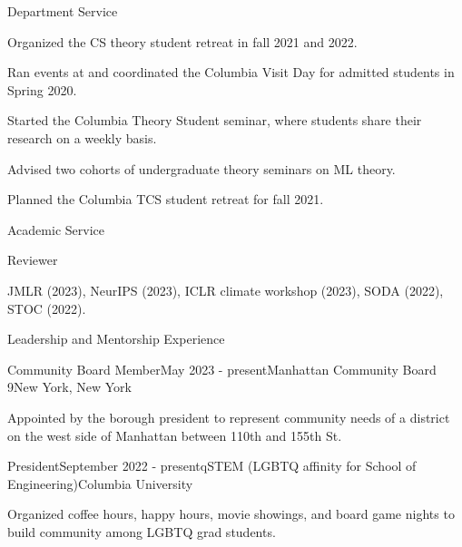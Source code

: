 \documentclass{resume} %
\begin{document}
\begin{rSection}{Department Service}
\begin{rSubsection}{}{}{}

    \item Organized the CS theory student retreat in fall 2021 and 2022.
    \item Ran events at and coordinated the Columbia Visit Day for admitted students in Spring 2020.
    \item Started the Columbia Theory Student seminar, where students share their research on a weekly basis.
    \item Advised two cohorts of undergraduate theory seminars on ML theory.
    \item Planned the Columbia TCS student retreat for fall 2021.
\end{rSubsection}

\begin{rSection}{Academic Service}
\begin{rSubsection}{Reviewer}{}{}

    \item JMLR (2023), NeurIPS (2023), ICLR climate workshop (2023), SODA (2022), STOC (2022).
\end{rSubsection}

\end{rSection}

\begin{rSection}{Leadership and Mentorship Experience}

\begin{rSubsection}{Community Board Member}{May 2023 - present}{Manhattan Community Board 9}{New York, New York}
\item Appointed by the borough president to represent community needs of a district on the west side of Manhattan between 110th and 155th St. 
\end{rSubsection}

\begin{rSubsection}{President}{September 2022 - present}{qSTEM (LGBTQ affinity for School of Engineering)}{Columbia University}
\item Organized coffee hours, happy hours, movie showings, and board game nights to build community among LGBTQ grad students.
\end{rSubsection}


\end{rSection}
\end{rSection}
\end{document}
